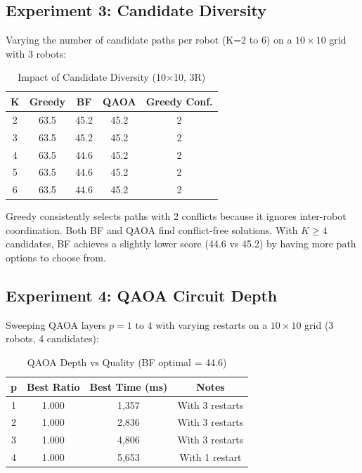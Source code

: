 \documentclass[conference]{IEEEtran}
\begin{document}
\subsection{Experiment 3: Candidate Diversity}

Varying the number of candidate paths per robot (K=2 to 6) on a $10\times10$ grid with 3 robots:

\begin{table}[h]
\centering
\caption{Impact of Candidate Diversity (10$\times$10, 3R)}
\label{tab:exp3}
\begin{tabular}{@{}ccccc@{}}
\toprule
\textbf{K} & \textbf{Greedy} & \textbf{BF} & \textbf{QAOA} & \textbf{Greedy Conf.} \\
\midrule
2 & 63.5 & 45.2 & 45.2 & 2 \\
3 & 63.5 & 45.2 & 45.2 & 2 \\
4 & 63.5 & 44.6 & 45.2 & 2 \\
5 & 63.5 & 44.6 & 45.2 & 2 \\
6 & 63.5 & 44.6 & 45.2 & 2 \\
\bottomrule
\end{tabular}
\end{table}

Greedy consistently selects paths with 2 conflicts because it ignores inter-robot coordination. Both BF and QAOA find conflict-free solutions. With $K \geq 4$ candidates, BF achieves a slightly lower score (44.6 vs 45.2) by having more path options to choose from.

\subsection{Experiment 4: QAOA Circuit Depth}

Sweeping QAOA layers $p = 1$ to $4$ with varying restarts on a $10\times10$ grid (3 robots, 4 candidates):

\begin{table}[h]
\centering
\caption{QAOA Depth vs Quality (BF optimal = 44.6)}
\label{tab:exp4}
\begin{tabular}{@{}cccc@{}}
\toprule
\textbf{p} & \textbf{Best Ratio} & \textbf{Best Time (ms)} & \textbf{Notes} \\
\midrule
1 & 1.000 & 1,357 & With 3 restarts \\
2 & 1.000 & 2,836 & With 3 restarts \\
3 & 1.000 & 4,806 & With 3 restarts \\
4 & 1.000 & 5,653 & With 1 restart \\
\bottomrule
\end{tabular}
\end{table}
\end{document}

